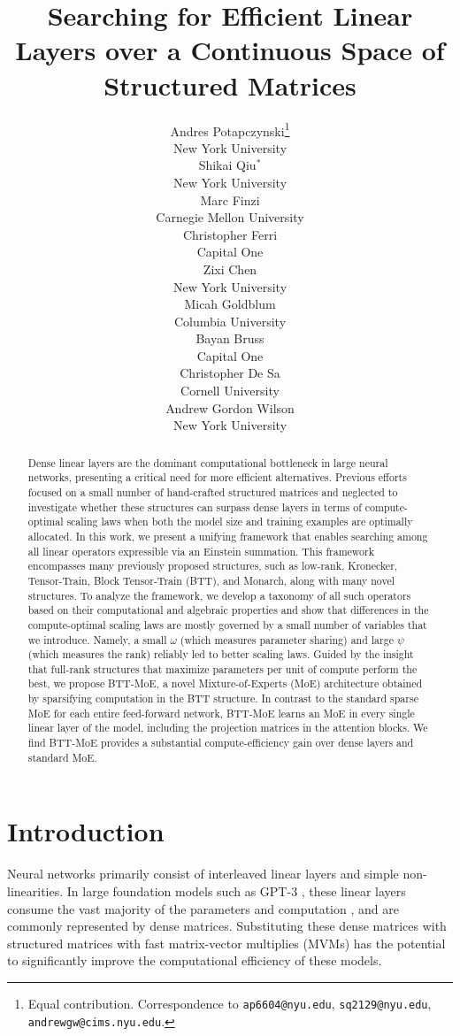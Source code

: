 \documentclass{article}
\title{Searching for Efficient Linear Layers over a Continuous Space of Structured Matrices}
\author{
  Andres Potapczynski\thanks{Equal contribution. Correspondence to \texttt{ap6604@nyu.edu},
  \texttt{sq2129@nyu.edu}, \texttt{andrewgw@cims.nyu.edu}.} \\
  New York University\\
  \And
  Shikai Qiu$^{*}$ \\
  New York University \\
  \And
  Marc Finzi \\
  Carnegie Mellon University \\
  \And
  Christopher Ferri \\
  Capital One \\
  \And
  Zixi Chen \\
  New York University\\
  \And
  Micah Goldblum \\
  Columbia University\\
  \And
  Bayan Bruss \\
  Capital One \\
  \And
  Christopher De Sa \\
  Cornell University \\
  \And
  Andrew Gordon Wilson \\
  New York University \\
}
\begin{document}
\maketitle

\begin{abstract}
Dense linear layers are the dominant computational bottleneck in large neural networks, presenting a critical need for more efficient alternatives.
Previous efforts focused on a small number of hand-crafted structured matrices and neglected to investigate whether these structures can surpass dense layers in terms of compute-optimal scaling laws when both the model size and training examples are optimally allocated.
In this work, we present a unifying framework that enables searching among all linear operators expressible via an Einstein summation.
This framework encompasses many previously proposed structures, such as low-rank, Kronecker, Tensor-Train, Block Tensor-Train (BTT), and Monarch, along with many novel structures.
To analyze the framework, we develop a taxonomy of all such operators based on their computational and algebraic properties and show that differences in the compute-optimal scaling laws are mostly governed by a small number of variables that we introduce.
Namely, a small $\omega$ (which measures parameter sharing) and large $\psi$ (which measures the rank) reliably led to better scaling laws.
Guided by the insight that full-rank structures that maximize parameters per unit of compute perform the best, we propose BTT-MoE, a novel Mixture-of-Experts (MoE) architecture obtained by sparsifying computation in the BTT structure. In contrast to the standard sparse MoE for each entire feed-forward network, BTT-MoE learns an MoE in every single linear layer of the model, including the projection matrices in the attention blocks. We find BTT-MoE provides a substantial compute-efficiency gain over dense layers and standard MoE.
\end{abstract}

\section{Introduction}
Neural networks primarily consist of interleaved linear layers and simple non-linearities. In large foundation models such as GPT-3 \citep{brown2020language}, these linear layers consume the vast majority of the parameters and computation \citep{kaplan2020scaling}, and are commonly represented by dense matrices.
Substituting these dense matrices with structured matrices with fast matrix-vector multiplies (MVMs) has the potential to significantly improve the computational efficiency of these models.
\end{document}
